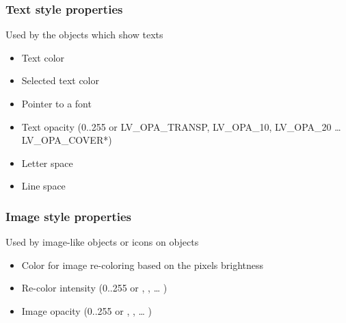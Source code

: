 \documentclass[letterpaper,10pt,english]{sphinxmanual}
\begin{document}
\subsubsection{Text style properties}
\label{\detokenize{overview/styles:text-style-properties}}
Used by the objects which show texts
\begin{itemize}
\item {} 
 Text color

\item {} 
 Selected text color

\item {} 
 Pointer to a font

\item {} 
 Text opacity (0..255 or LV\_OPA\_TRANSP, LV\_OPA\_10, LV\_OPA\_20 … LV\_OPA\_COVER*)

\item {} 
 Letter space

\item {} 
 Line space

\end{itemize}


\subsubsection{Image style properties}
\label{\detokenize{overview/styles:image-style-properties}}
Used by image-like objects or icons on objects
\begin{itemize}
\item {} 
 Color for image re-coloring based on the pixels brightness

\item {} 
 Re-color intensity (0..255 or , ,  … )

\item {} 
 Image opacity (0..255 or , ,  … )

\end{itemize}
\end{document}
